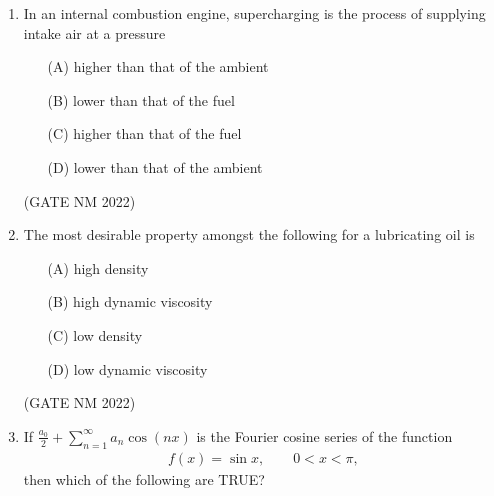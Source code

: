 \documentclass[journal,12pt,onecolumn]{IEEEtran}
\theoremstyle{remark}
\begin{document}
\begin{enumerate}
\begin{multicols}{2}
\begin{enumerate}
    \item[(A)] spark
    \item[(B)] preheating of the fuel
    \item[(C)] heating due to the compression of intake air
    \item[(D)] preheating of the intake air
\end{enumerate}

	\end{multicols}

\hfill(GATE NM 2022)



\item  In an internal combustion engine, supercharging is the process of supplying intake air at a pressure

\begin{enumerate}
    \item[(A)] higher than that of the ambient
    \item[(B)] lower than that of the fuel
    \item[(C)] higher than that of the fuel
    \item[(D)] lower than that of the ambient
\end{enumerate}

\hfill(GATE NM 2022)






\item  The most desirable property amongst the following for a lubricating oil is

	\begin{multicols}{2}

\begin{enumerate}
    \item[(A)] high density
    \item[(B)] high dynamic viscosity
    \item[(C)] low density
    \item[(D)] low dynamic viscosity
\end{enumerate}

	\end{multicols}

\hfill(GATE NM 2022)









\item  If
$
\frac{a_0}{2} + \sum_{n=1}^{\infty} a_n \cos(nx)
$
is the Fourier cosine series of the function
\begin{align*}
f(x)=\sin x,\qquad 0<x<\pi,
\end{align*}
then which of the following are TRUE?


\end{enumerate}
\end{document}
